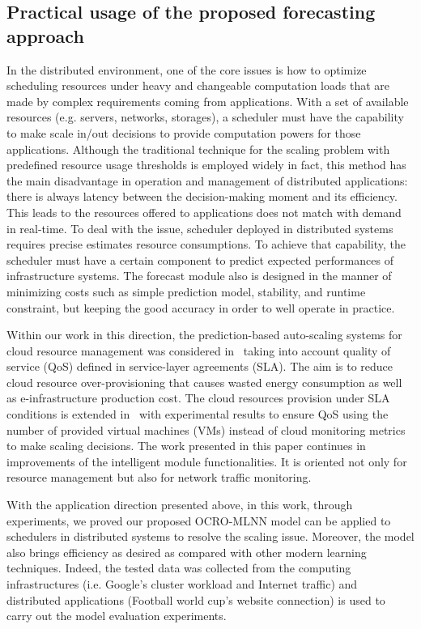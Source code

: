 \documentclass[11pt,twoside]{article}
\begin{document}
\begin{multicols}{2}
\subsection{Practical usage of the proposed forecasting approach}
\label{pratical_usage}
In the distributed environment, one of the core issues is how to optimize scheduling resources under heavy and changeable computation loads that are made by complex requirements coming from applications. With a set of available resources (e.g. servers, networks, storages), a scheduler \citep{nguyen2016enhancing} must have the capability to make scale in/out decisions to provide computation powers for those applications. Although the traditional technique for the scaling problem with predefined resource usage thresholds is employed widely in fact, this method has the main disadvantage in operation and management of distributed applications: there is always latency between the decision-making moment and its efficiency. This leads to the resources offered to applications does not match with demand in real-time. To deal with the issue, scheduler deployed in distributed systems requires precise estimates resource consumptions. To achieve that capability, the scheduler must have a certain component to predict expected performances of infrastructure systems. The forecast module also is designed in the manner of minimizing costs such as simple prediction model, stability, and runtime constraint, but keeping the good accuracy in order to well operate in practice. 


Within our work in this direction, the prediction-based auto-scaling systems for cloud resource management was considered in~\citep{ref_thieu} taking into account quality of service (QoS) defined in service-layer agreements (SLA). The aim is to reduce cloud resource over-provisioning that causes wasted energy consumption as well as e-infrastructure production cost. The cloud resources provision under SLA conditions is extended in~\citep{nguyen2019building} with experimental results to ensure QoS using the number of provided virtual machines (VMs) instead of cloud monitoring metrics to make scaling decisions.  The work presented in this paper continues in improvements of the intelligent module functionalities. It is oriented not only for resource management but also for network traffic monitoring.

With the application direction presented above, in this work, through experiments, we proved our proposed OCRO-MLNN model can be applied to schedulers in distributed systems to resolve the scaling issue. Moreover, the model also brings efficiency as desired as compared with other modern learning techniques. Indeed, the tested data was collected from the computing infrastructures (i.e. Google's cluster workload and Internet traffic) and distributed applications (Football world cup's website connection) is used to carry out the model evaluation experiments. 



\end{multicols}
\end{document}
